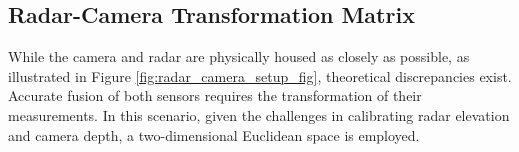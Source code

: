 \iffalse
\subsection{Radar-Camera Transformation Matrix}
While the camera and radar are physically housed as closely as possible, 
as illustrated in Figure \ref{fig:radar_camera_setup_fig}, 
theoretical discrepancies exist.
Accurate fusion of both sensors requires the transformation of their measurements. 
In this scenario, given the challenges in calibrating radar elevation and camera depth, 
a two-dimensional Euclidean space is employed.

